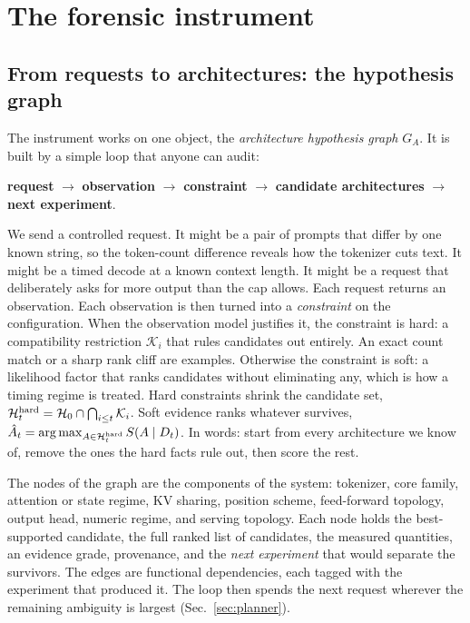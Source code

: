 \section{The forensic instrument}
\label{sec:instrument}
\subsection{From requests to architectures: the hypothesis graph}
\label{sec:graph}
The instrument works on one object, the \emph{architecture hypothesis graph} $G_A$.  It
is built by a simple loop that anyone can audit:
\begin{center}
\textbf{request} $\rightarrow$ \textbf{observation} $\rightarrow$ \textbf{constraint}
$\rightarrow$ \textbf{candidate architectures} $\rightarrow$ \textbf{next experiment}.
\end{center}
We send a controlled request.  It might be a pair of prompts that differ by one known
string, so the token-count difference reveals how the tokenizer cuts text.  It might be
a timed decode at a known context length.  It might be a request that deliberately asks
for more output than the cap allows.  Each request returns an observation.  Each
observation is then turned into a \emph{constraint} on the configuration.  When the
observation model justifies it, the constraint is hard: a compatibility restriction
$\mathcal K_i$ that rules candidates out entirely.  An exact count match or a sharp rank
cliff are examples.  Otherwise the constraint is soft: a likelihood factor that ranks
candidates without eliminating any, which is how a timing regime is treated.  Hard
constraints shrink the candidate set, $\mathcal H_t^{\rm hard}=\mathcal
H_0\cap\bigcap_{i\le t}\mathcal K_i$.  Soft evidence ranks whatever survives, $\hat
A_t=\arg\max_{A\in\mathcal H_t^{\rm hard}}S(A\mid D_t)$.  In words: start from every
architecture we know of, remove the ones the hard facts rule out, then score the rest.

The nodes of the graph are the components of the system: tokenizer, core family,
attention or state regime, KV sharing, position scheme, feed-forward topology, output
head, numeric regime, and serving topology.  Each node holds the best-supported
candidate, the full ranked list of candidates, the measured quantities, an evidence
grade, provenance, and the \emph{next experiment} that would separate the survivors.
The edges are functional dependencies, each tagged with the experiment that produced
it.  The loop then spends the next request wherever the remaining ambiguity is largest
(Sec.~\ref{sec:planner}).

